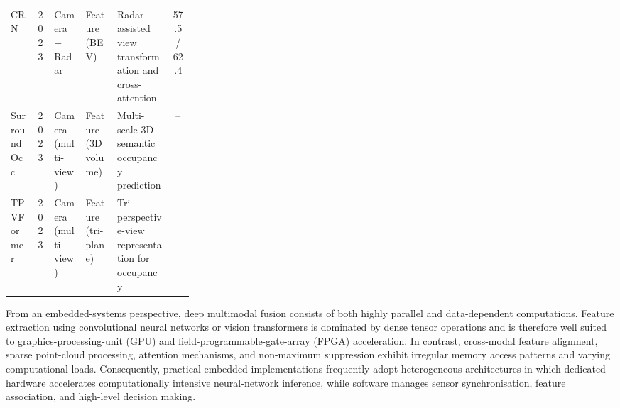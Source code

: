 \begin{table}[!t]
\begin{adjustbox}{max width=\textwidth}
\begin{tabular}{l c l l p{0.30\linewidth} c}
        CRN \cite{kim2023_crn} & 2023 & Camera + Radar & Feature (BEV) & Radar-assisted view transformation and cross-attention & 57.5 / 62.4 \\
        SurroundOcc \cite{wei2023_surroundocc} & 2023 & Camera (multi-view) & Feature (3D volume) & Multi-scale 3D semantic occupancy prediction & -- \\
        TPVFormer \cite{huang2023_tpvformer} & 2023 & Camera (multi-view) & Feature (tri-plane) & Tri-perspective-view representation for occupancy & -- \\
        \hline
    \end{tabular}
    \end{adjustbox}
\end{table}

From an embedded-systems perspective, deep multimodal fusion consists of both highly parallel and data-dependent computations. Feature extraction using convolutional neural networks or vision transformers is dominated by dense tensor operations and is therefore well suited to graphics-processing-unit (GPU) and field-programmable-gate-array (FPGA) acceleration. In contrast, cross-modal feature alignment, sparse point-cloud processing, attention mechanisms, and non-maximum suppression exhibit irregular memory access patterns and varying computational loads. Consequently, practical embedded implementations frequently adopt heterogeneous architectures in which dedicated hardware accelerates computationally intensive neural-network inference, while software manages sensor synchronisation, feature association, and high-level decision making.

